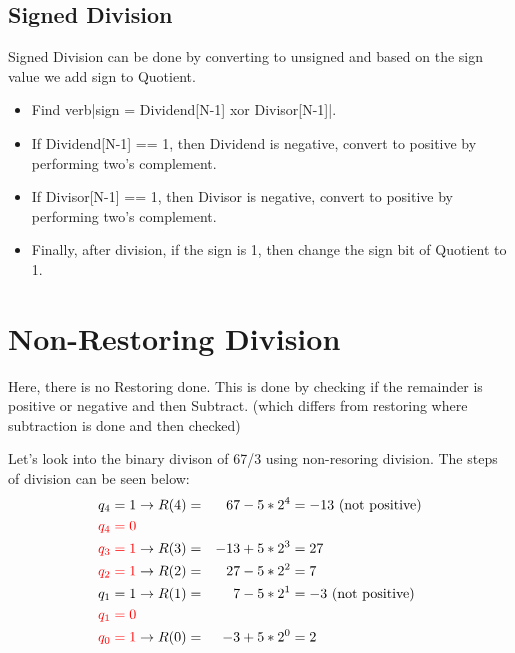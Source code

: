 \documentclass{article}
\begin{document}
\subsection{Signed Division}
Signed Division can be done by converting to unsigned and based on the sign value we add sign to Quotient.

\begin{itemize}
    \item Find verb|sign = Dividend[N-1] xor Divisor[N-1]|.
    \item If Dividend[N-1] == 1, then Dividend is negative, convert to positive by performing two's complement.
    \item If Divisor[N-1] == 1, then Divisor is negative, convert to positive by performing two's complement.
    \item Finally, after division, if the sign is 1, then change the sign bit of Quotient to 1.    
\end{itemize}

\section{Non-Restoring Division}
Here, there is no Restoring done.
This is done by checking if the remainder is positive or negative and then Subtract. (which differs from restoring where subtraction is done and then checked)



Let's look into the binary divison of 67/3 using non-resoring division.
The steps of division can be seen below:
\begin{align*}
    q_4 = 1                  & \rightarrow R(4) = & 67 - 5 * 2^4  & = -13 \text{ (not positive)} \\
    \textcolor{red}{q_4 = 0}                                                                     \\
    \textcolor{red}{q_3 = 1} & \rightarrow R(3) = & -13 + 5 * 2^3 & = 27                         \\
    \textcolor{red}{q_2 = 1} & \rightarrow R(2) = & 27 - 5 * 2^2  & = 7                          \\
    q_1= 1                   & \rightarrow R(1) = & 7 - 5 * 2^1   & = -3 \text{ (not positive)}  \\
    \textcolor{red}{q_1 = 0}                                                                     \\
    \textcolor{red}{q_0 = 1} & \rightarrow R(0) = & -3 + 5 * 2^0  & = 2                          \\
\end{align*}
\end{document}
